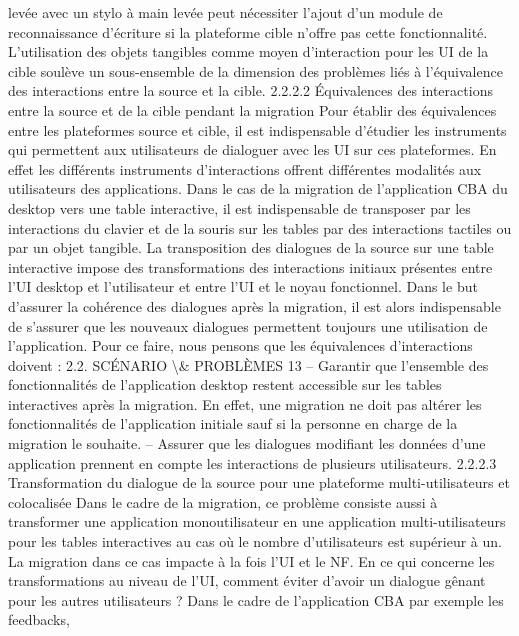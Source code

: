 \documentclass{article}
\begin{document}
lev\'{e}e avec un stylo \`{a} main lev\'{e}e peut n\'{e}cessiter l’ajout d’un module de reconnaissance d’\'{e}criture si la
plateforme cible n’offre pas cette fonctionnalit\'{e}.
L’utilisation des objets tangibles comme moyen d’interaction pour les UI de la cible soul\`{e}ve un
sous-ensemble de la dimension des probl\`{e}mes li\'{e}s \`{a} l’\'{e}quivalence des interactions entre la source et
la cible.
2.2.2.2
Équivalences des interactions entre la source et de la cible pendant la migration
Pour \'{e}tablir des \'{e}quivalences entre les plateformes source et cible, il est indispensable d’\'{e}tudier
les instruments qui permettent aux utilisateurs de dialoguer avec les UI sur ces plateformes. En effet
les diff\'{e}rents instruments d’interactions offrent diff\'{e}rentes modalit\'{e}s aux utilisateurs des applications.
Dans le cas de la migration de l’application CBA du desktop vers une table interactive, il est indispensable de transposer par les interactions du clavier et de la souris sur les tables par des interactions
tactiles ou par un objet tangible.
La transposition des dialogues de la source sur une table interactive impose des transformations
des interactions initiaux pr\'{e}sentes entre l’UI desktop et l’utilisateur et entre l’UI et le noyau fonctionnel. Dans le but d’assurer la coh\'{e}rence des dialogues apr\`{e}s la migration, il est alors indispensable
de s’assurer que les nouveaux dialogues permettent toujours une utilisation de l’application. Pour ce
faire, nous pensons que les \'{e}quivalences d’interactions doivent :
2.2. SCÉNARIO \textbackslash{}& PROBLÈMES
13
– Garantir que l’ensemble des fonctionnalit\'{e}s de l’application desktop restent accessible sur les
tables interactives apr\`{e}s la migration. En effet, une migration ne doit pas alt\'{e}rer les fonctionnalit\'{e}s de l’application initiale sauf si la personne en charge de la migration le souhaite.
– Assurer que les dialogues modiﬁant les donn\'{e}es d’une application prennent en compte les interactions de plusieurs utilisateurs.
2.2.2.3
Transformation du dialogue de la source pour une plateforme multi-utilisateurs et colocalis\'{e}e
Dans le cadre de la migration, ce probl\`{e}me consiste aussi \`{a} transformer une application monoutilisateur en une application multi-utilisateurs pour les tables interactives au cas o\`{u} le nombre d’utilisateurs est sup\'{e}rieur \`{a} un. La migration dans ce cas impacte \`{a} la fois l’UI et le NF.
En ce qui concerne les transformations au niveau de l’UI, comment \'{e}viter d’avoir un dialogue
g\^{e}nant pour les autres utilisateurs ? Dans le cadre de l’application CBA par exemple les feedbacks,
\end{document}
